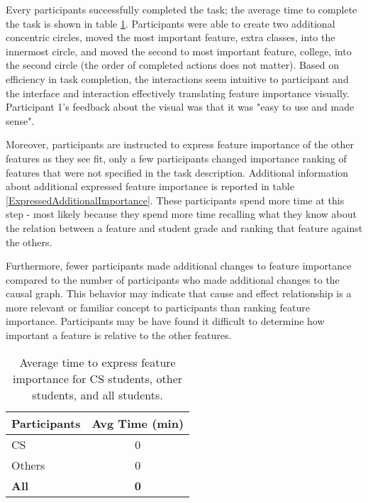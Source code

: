 Every participants successfully completed the task; the average time to complete the task is shown in table \ref{FeatureImportanceTaskTime}. Participants were able to create two additional concentric circles, moved the most important feature, extra classes, into the innermost circle, and moved the second to most important feature, college, into the second circle (the order of completed actions does not matter). Based on efficiency in task completion, the interactions seem intuitive to participant and the interface and interaction effectively translating feature importance visually. Participant 1's feedback about the visual was that it was "easy to use and made sense".

Moreover, participants are instructed to express feature importance of the other features as they see fit, only a few participants changed importance ranking of features that were not specified in the task description. Additional information about additional expressed feature importance is reported in table \ref{ExpressedAdditionalImportance}. These participants spend more time at this step - most likely because they spend more time recalling what they know about the relation between a feature and student grade and ranking that feature against the others.

Furthermore, fewer participants made additional changes to feature importance compared to the number of participants who made additional changes to the causal graph. This behavior may indicate that cause and effect relationship is a more relevant or familiar concept to participants than ranking feature importance. Participants may be have found it difficult to determine how important a feature is relative to the other features.

\begin{table}[]
\centering
\begin{tabular}{lc}
\hline
Participants    & Avg Time (min) \\ \hline
CS     & 0               \\
Others & 0              \\ \hline
\textbf{All}    & \textbf{0}             \\ \hline
\end{tabular}
\caption{Average time to express feature importance for CS students, other students, and all students.}
\label{FeatureImportanceTaskTime}
\end{table}

